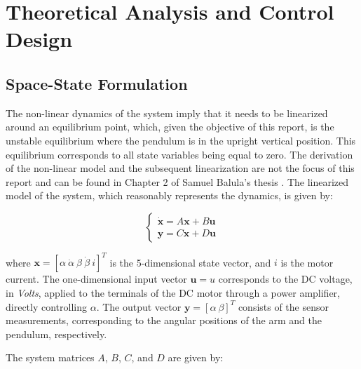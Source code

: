 \newpage
\section{Theoretical Analysis and Control Design}

\subsection{Space-State Formulation}

\par The non-linear dynamics of the system imply that it needs to be linearized around an equilibrium point, which, given the objective of this report, is the unstable equilibrium where the pendulum is in the upright vertical position. 
This equilibrium corresponds to all state variables being equal to zero. The derivation of the non-linear model and the subsequent 
linearization are not the focus of this report and can be found in Chapter 2 of Samuel Balula's thesis \cite{balula2016inverted}.  
The linearized model of the system, which reasonably represents the dynamics, is given by:

\vspace{1pt}
\[
\begin{cases}
\mathbf{\dot{x}} = A \mathbf{x} + B \mathbf{u} \\
\mathbf{y} = C \mathbf{x} + D \mathbf{u}
\end{cases}
\]
\vspace{1pt}

\par where $\mathbf{x} = [\alpha \ \dot{\alpha} \ \beta \ \dot{\beta} \ i]^T$ is the 5-dimensional state vector, and $i$ is the motor current. The one-dimensional input vector $\mathbf{u} = u$ corresponds to the DC voltage, in \textit{Volts}, applied to the terminals of the DC motor through a power amplifier, directly controlling $\alpha$. The output vector $\mathbf{y} = [\alpha \ \beta]^T$ consists of the sensor measurements, corresponding to the angular positions of the arm and the pendulum, respectively.

\par The system matrices $A$, $B$, $C$, and $D$ are given by:


